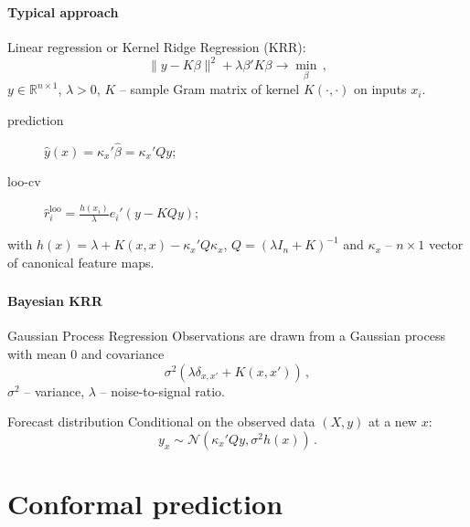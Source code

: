\documentclass[t]{beamer}  %
\newcommand{\Ncal}{\mathcal{N}}
\newcommand{\Real}{\mathbb{R}}
\begin{document}

\begin{frame}[c]\frametitle{\insertsection}
  \framesubtitle{Typical approach}
  Linear regression or Kernel Ridge Regression (KRR):
  $$ \|y - K\beta \|^2 + \lambda \beta' K \beta \to \min_\beta \,, $$
  $y\in \Real^{n\times1}$, $\lambda > 0$, $K$ -- sample Gram matrix of kernel
  $K(\cdot,\cdot)$ on inputs $x_i$.
  \vspace{\baselineskip}
  \begin{description}
    \item[prediction] $\hat{y}(x) = \kappa_x' \hat{\beta} = \kappa_x' Q y$;
    \item[loo-cv] $\hat{r}^{\text{loo}}_i = \frac{h(x_i)}{\lambda} e_i'(y - K Q y)$;
  \end{description}
  with $h(x) = \lambda + K(x,x) - \kappa_x' Q \kappa_x$, $Q = (\lambda I_n + K)^{-1}$ and
  $\kappa_x$ -- $n\times 1$ vector of canonical feature maps.
\end{frame}

\begin{frame}[c]\frametitle{\insertsection}
  \framesubtitle{Bayesian KRR}
  \begin{block}{Gaussian Process Regression}  
    Observations are drawn from a Gaussian process with mean $0$ and covariance
    $$ \sigma^2(\lambda\delta_{x,x'} + K(x,x')) \,,$$
    $\sigma^2$ -- variance, $\lambda$ -- noise-to-signal ratio.
  \end{block}
  \vspace{\baselineskip}
  \begin{block}{Forecast distribution}
  Conditional on the observed data $(X, y)$ at a new $x$:
  $$ y_x \sim \Ncal(\kappa_x' Q y, \sigma^2 h(x)) \,. $$
  \end{block}
\end{frame}


\section{Conformal prediction} %
\label{sec:conformal_prediction}
\end{document}
